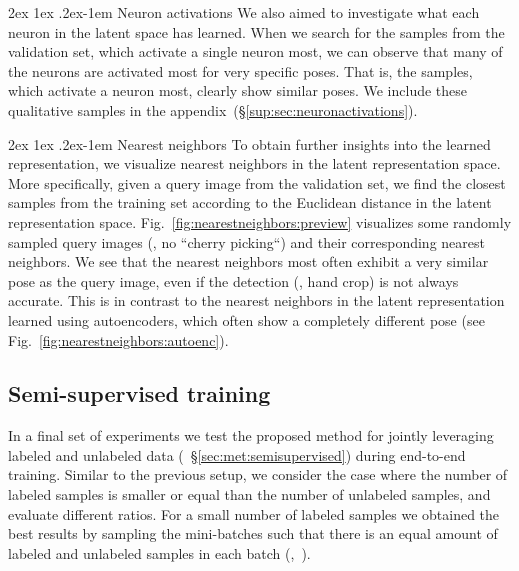 \documentclass[10pt,twocolumn,letterpaper]{article}
\makeatletter
\renewcommand{\paragraph}{%
  \@startsection{paragraph}{4}%
  {\z@}{2ex \@plus 1ex \@minus .2ex}{-1em}%
  {\normalfont\normalsize\bfseries}%
}
\makeatother
\begin{document}
\paragraph{Neuron activations}
We also aimed to investigate what each neuron in the latent space has learned.
When we search for the samples from the validation set, 
which activate a single neuron most,
we can observe that many of the neurons are activated most for very specific poses.
That is, the samples, which activate a neuron most, clearly show similar poses.
We include these qualitative samples in the appendix~(\S\ref{sup:sec:neuronactivations}).

\paragraph{Nearest neighbors}
To obtain further insights into the learned representation, 
we visualize nearest neighbors in the latent representation space.
More specifically, given a query image from the validation set, we find the closest samples 
from the training set according to the Euclidean distance in the latent representation space.
Fig.~\ref{fig:nearestneighbors:preview} visualizes some randomly sampled query images 
(\ie, no ``cherry picking``) and their corresponding nearest neighbors.
We see that the nearest neighbors most often exhibit a very similar pose as the 
query image, even if the detection (\ie, hand crop) is not always accurate.
This is in contrast to the nearest neighbors in the latent representation learned 
using autoencoders, which often show a completely different pose 
(see Fig.~\ref{fig:nearestneighbors:autoenc}).

\subsection{Semi-supervised training}\label{sec:exp:semisupervised}
In a final set of experiments we test the proposed method for jointly leveraging 
labeled and unlabeled data (\cf~\S\ref{sec:met:semisupervised}) 
during end-to-end training.
Similar to the previous setup, 
we consider the case where the number of labeled samples 
is smaller or equal than the number of unlabeled samples, and 
evaluate different ratios.
For a small number of labeled samples 
we obtained the best results by sampling the mini-batches such that 
there is an equal amount of labeled and unlabeled samples in each batch 
(\cf,~\cite{Zhou2017iccv_3dposeinthewild}).
\end{document}
